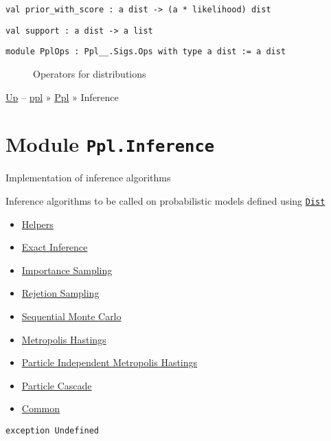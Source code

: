 \protect\hyperlink{val-priorux5fwithux5fscore}{}\texttt{val\ prior\_with\_score\ :\ \textquotesingle{}a\ dist\ -\textgreater{}\ (\textquotesingle{}a\ *\ likelihood)\ dist}

\protect\hyperlink{val-support}{}\texttt{val\ support\ :\ \textquotesingle{}a\ dist\ -\textgreater{}\ \textquotesingle{}a\ list}

\begin{description}
\item[{\protect\hyperlink{module-PplOps}{}\texttt{module\ PplOps\ :\ Ppl\_\_.Sigs.Ops\ with\ type\ \textquotesingle{}a\ dist\ :=\ \textquotesingle{}a\ dist}}]
Operators for distributions
\end{description}

\href{../index.html}{Up} -- \href{../../index.html}{ppl} »
\href{../index.html}{Ppl} » Inference

\section{\texorpdfstring{Module
\texttt{Ppl.Inference}}{Module Ppl.Inference}}\label{module-ppl.inference}

Implementation of inference algorithms

Inference algorithms to be called on probabilistic models defined using
\href{../Dist/index.html}{\texttt{Dist}}

\begin{itemize}
\tightlist
\item
  \protect\hyperlink{infux5fhelpers}{Helpers}
\item
  \protect\hyperlink{infux5fexact}{Exact Inference}
\item
  \protect\hyperlink{infux5fimp}{Importance Sampling}
\item
  \protect\hyperlink{rejux5fhelpers}{Rejetion Sampling}
\item
  \protect\hyperlink{infux5fsmc}{Sequential Monte Carlo}
\item
  \protect\hyperlink{infux5fmh}{Metropolis Hastings}
\item
  \protect\hyperlink{infux5fpmcmc}{Particle Independent Metropolis
  Hastings}
\item
  \protect\hyperlink{infux5fpc}{Particle Cascade}
\item
  \protect\hyperlink{com}{Common}
\end{itemize}

\protect\hyperlink{exception-Undefined}{}\texttt{exception\ }\texttt{Undefined}

